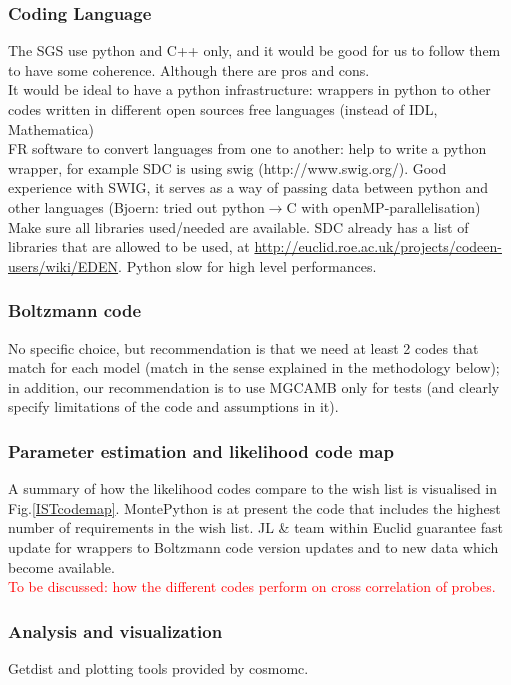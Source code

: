 \subsubsection{Coding Language}
The SGS use python and C++ only, and it would be good for us to follow them to have some coherence. Although there are pros and cons.\\
It would be ideal to have a python infrastructure: wrappers in python to other codes written in different open sources free languages (instead of IDL, Mathematica)\\
FR software to convert languages from one to another: help to write a python wrapper, for example SDC is using swig (http://www.swig.org/).
Good experience with SWIG, it serves as a way of passing data between python and other languages (Bjoern: tried out python$\rightarrow$C with openMP-parallelisation)\\
Make sure all libraries used/needed are available. 
SDC already has a list of libraries that are allowed to be used, at \url{http://euclid.roe.ac.uk/projects/codeen-users/wiki/EDEN}.
Python slow for high level performances. 

\subsubsection{Boltzmann code}

No specific choice, but recommendation is that we need at least 2 codes that match for each model (match in the sense explained in the methodology below); 
in addition, our recommendation is to use MGCAMB only for tests (and clearly specify limitations of the code and assumptions in it).


\subsubsection{Parameter estimation and likelihood code map}
A summary of how the likelihood codes compare to the wish list is visualised in Fig.\ref{ISTcodemap}. MontePython is at present the code that includes the highest number of requirements in the wish list. JL \& team within Euclid guarantee fast 
update for wrappers to Boltzmann code version updates and to new data which become available. \\
\textcolor{red}{To be discussed: how the different codes perform on cross correlation of probes.}

\subsubsection{Analysis and visualization}
Getdist and plotting tools provided by cosmomc.

